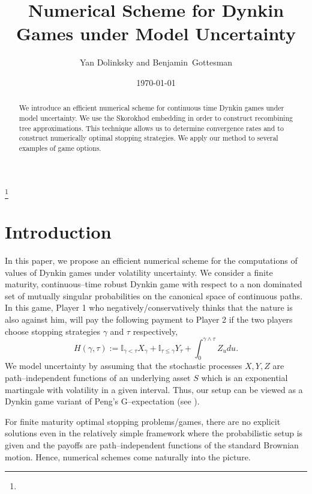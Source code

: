 \documentclass{amsart}
\numberwithin{equation}{section}
\begin{document}
\title{Numerical Scheme for Dynkin Games under Model Uncertainty}
\thanks{}

\author{Yan Dolinksky and Benjamin~Gottesman }


\date{\today}


\maketitle \markboth{}{}
\renewcommand{\theequation}{\arabic{section}.\arabic{equation}}

\begin{abstract}\noindent
We introduce an efficient numerical scheme for continuous time Dynkin
games under model uncertainty. We use the Skorokhod embedding in order to
construct recombining tree approximations. This technique allows us to
determine convergence rates and to construct numerically optimal stopping strategies.
We apply our method to several examples of game options.
\end{abstract}




\section{Introduction}\label{sec:1}\setcounter{equation}{0}
In this paper, we propose an efficient numerical scheme for the computations of
values of Dynkin games under volatility uncertainty.
We consider a finite maturity, continuous--time robust Dynkin game with respect to a non dominated set of mutually singular
probabilities on the canonical space of continuous paths. In this game, Player 1 who negatively/conservatively
thinks that the nature is also against him, will pay the following payment to Player 2 if the two players choose
stopping strategies $\gamma$ and $\tau$ respectively,
\begin{equation}\label{1.1}
H(\gamma,\tau):=\mathbb{I}_{\gamma<\tau}X_{\gamma}+\mathbb{I}_{\tau\leq\gamma}Y_{\tau}+\int_{0}^{\gamma\wedge\tau}Z_u du.
\end{equation}
We model uncertainty by assuming that the stochastic processes $X,Y,Z$ are path--independent
functions of an underlying asset $S$ which is an exponential martingale with volatility
in a given interval.
Thus, our setup can be viewed as
a Dynkin game variant of Peng's G--expectation (see \cite{P}).

For finite maturity optimal stopping problems/games,
there are no explicit solutions even in the relatively simple framework where the
probabilistic setup is given and the payoffs are path--independent functions of the standard Brownian motion.
Hence, numerical schemes come naturally into the picture.
\end{document}

